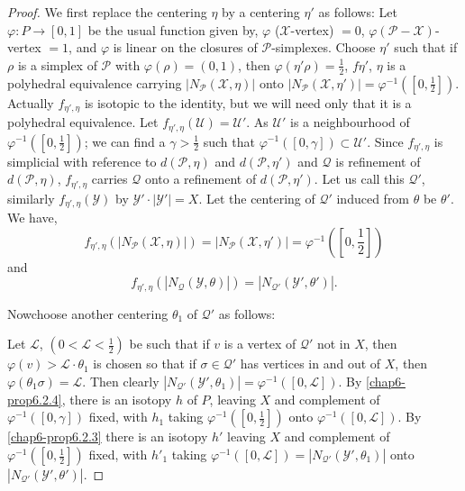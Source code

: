 \begin{proof}
We first replace the centering $\eta$ by a centering $\eta'$ as follows: Let $\varphi:P\to [0,1]$ be the usual function given by, $\varphi$ ($\mathscr{X}$-vertex) $=0$, $\varphi(\mathscr{P}-\mathscr{X})$-vertex $=1$, and $\varphi$ is linear on the closures of $\mathscr{P}$-simplexes. Choose $\eta'$ such that if $\rho$ is a simplex of $\mathscr{P}$ with $\varphi(\rho)=(0,1)$, then $\varphi(\eta'\rho)=\frac{1}{2}$, $f\eta'$, $\eta$ is a polyhedral equivalence carrying $|N_{\mathscr{P}}(\mathscr{X},\eta)|$ onto $|N_{\mathscr{P}}(\mathscr{X},\eta')|=\varphi^{-1}([0,\frac{1}{2}])$. Actually $f_{\eta',\eta}$ is isotopic to the identity, but we will need only that it is a polyhedral equivalence. Let $f_{\eta', \eta}(\mathscr{U})=\mathscr{U}'$. As $\mathscr{U}'$ is a neighbourhood of $\varphi^{-1}([0,\frac{1}{2}])$; we can find a $\gamma>\frac{1}{2}$ such that $\varphi^{-1}([0,\gamma])\subset \mathscr{U}'$. Since $f_{\eta',\eta}$ is simplicial with reference to $d(\mathscr{P},\eta)$ and $d(\mathscr{P},\eta')$ and $\mathcal{Q}$ is refinement of $d(\mathscr{P},\eta)$, $f_{\eta',\eta}$ carries $\mathcal{Q}$ onto a refinement of $d(\mathscr{P},\eta')$. Let us call this $\mathcal{Q}'$, similarly $f_{\eta',\eta}(\mathscr{Y})$ by $\mathscr{Y}'\cdot |\mathscr{Y}'|=X$. Let the centering of $\mathcal{Q}'$ induced from $\theta$ be $\theta'$. We have,
$$
f_{\eta',\eta}(|N_{\mathscr{P}}(\mathscr{X},\eta)|)=|N_{\mathscr{P}}(\mathscr{X},\eta')|=\varphi^{-1}([0,\frac{1}{2}])
$$
and
$$
f_{\eta',\eta}(|N_{\mathcal{Q}}(\mathscr{Y},\theta)|)=|N_{\mathcal{Q}'}(\mathscr{Y}',\theta')|.
$$

Now\pageoriginale choose another centering $\theta_{1}$ of $\mathcal{Q}'$ as follows: 

Let $\mathcal{L}$, $(0<\mathcal{L}<\frac{1}{2})$ be such that if $v$ is a vertex of $\mathcal{Q}'$ not in $X$, then $\varphi(v)>\mathcal{L}\cdot\theta_{1}$ is chosen so that if $\sigma\in\mathcal{Q}'$ has vertices in and out of $X$, then $\varphi(\theta_{1}\sigma)=\mathcal{L}$. Then clearly $|N_{\mathcal{Q}'}(\mathscr{Y}',\theta_{1})|=\varphi^{-1}([0,\mathcal{L}])$. By \ref{chap6-prop6.2.4}, there is an isotopy $h$ of $P$, leaving $X$ and complement of $\varphi^{-1}([0,\gamma])$ fixed, with $h_{1}$ taking $\varphi^{-1}([0,\frac{1}{2}])$ onto $\varphi^{-1}([0,\mathcal{L}])$. By \ref{chap6-prop6.2.3} there is an isotopy $h'$ leaving $X$ and complement of $\varphi^{-1}([0,\frac{1}{2}])$ fixed, with $h'_{1}$ taking $\varphi^{-1}([0,\mathcal{L}])=|N_{\mathcal{Q}'}(\mathscr{Y}',\theta_{1})|$ onto $|N_{\mathcal{Q}'}(\mathscr{Y}',\theta')|$. 


\end{proof}

